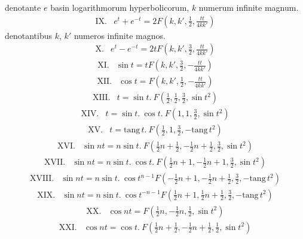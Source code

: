 denotante $e$ basin logarithmorum hyperbolicorum, $k$ numerum infinite magnum.
\[
\begin{array}{rl}
\mathrm{IX.}&e^t+e^{-t}=2F(k,k',\frac{1}{2},\frac{tt}{4kk'})
\end{array}
\]
denotantibus $k$, $k'$ numeros infinite magnos.
\[
\begin{array}{rl}
\mathrm{X.}&e^t-e^{-t}=2tF(k,k',\frac{3}{2},\frac{tt}{4kk'})
\end{array}
\]
\[
\begin{array}{rl}
\mathrm{XI.}&\sin t=tF(k,k',\frac{3}{2},-\frac{tt}{4kk'})
\end{array}
\]
\[
\begin{array}{rl}
\mathrm{XII.}&\cos t=F(k,k',\frac{1}{2},-\frac{tt}{4kk'})
\end{array}
\]
\[
\begin{array}{rl}
\mathrm{XIII.}&t=\sin t.\ F(\frac{1}{2},\frac{1}{2},\frac{3}{2},\sin t^2)
\end{array}
\]
\[
\begin{array}{rl}
\mathrm{XIV.}&t=\sin t.\ \cos t.\ F(1,1,\frac{3}{2},\sin t^2)
\end{array}
\]
\[
\begin{array}{rl}
\mathrm{XV.}&t=\mathrm{tang}\,t.\ F(\frac{1}{2},1,\frac{3}{2},-\mathrm{tang}\,t^2)
\end{array}
\]
\[
\begin{array}{rl}
\mathrm{XVI.}&\sin nt=n\sin t.\ F(\frac{1}{2}n+\frac{1}{2},-\frac{1}{2}n+\frac{1}{2},\frac{3}{2},\sin t^2)
\end{array}
\]
\[
\begin{array}{rl}
\mathrm{XVII.}&\sin nt=n\sin t.\ \cos t.\ F(\frac{1}{2}n+1,-\frac{1}{2}n+1,\frac{3}{2},\sin t^2)
\end{array}
\]
\[
\begin{array}{rl}
\mathrm{XVIII.}&\sin nt=n\sin t.\ \cos t^{n-1}F(-\frac{1}{2}n+1,-\frac{1}{2}n+\frac{1}{2},\frac{3}{2},-\mathrm{tang}\,t^2)
\end{array}
\]
\[
\begin{array}{rl}
\mathrm{XIX.}&\sin nt=n\sin t.\ \cos t^{-n-1}F(\frac{1}{2}n+1,\frac{1}{2}n+\frac{1}{2},\frac{3}{2},-\mathrm{tang}\,t^2)
\end{array}
\]
\[
\begin{array}{rl}
\mathrm{XX.}&\cos nt=F(\frac{1}{2}n,-\frac{1}{2}n,\frac{1}{2},\sin t^2)
\end{array}
\]
\[
\begin{array}{rl}
\mathrm{XXI.}&\cos nt=\cos t.\ F(\frac{1}{2}n+\frac{1}{2},-\frac{1}{2}n+\frac{1}{2},\frac{1}{2},\sin t^2)
\end{array}
\]
